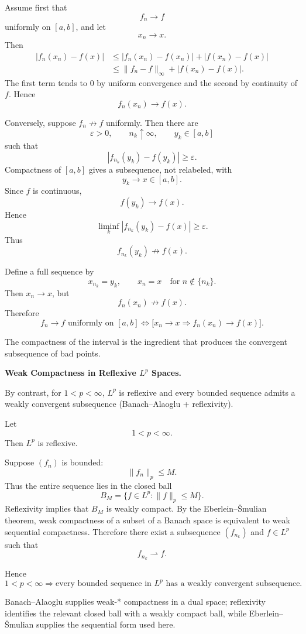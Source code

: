 \begin{solution}
Assume first that
\[
f_n\to f
\]
uniformly on \([a,b]\), and let
\[
x_n\to x.
\]
Then
\[
\begin{aligned}
|f_n(x_n)-f(x)|
&\le
|f_n(x_n)-f(x_n)|
+
|f(x_n)-f(x)|\\
&\le
\|f_n-f\|_\infty
+
|f(x_n)-f(x)|.
\end{aligned}
\]
The first term tends to \(0\) by uniform convergence and the second by continuity of \(f\).
Hence
\[
\boxed{f_n(x_n)\to f(x).}
\]

Conversely, suppose \(f_n\not\to f\) uniformly. Then there are
\[
\varepsilon>0,\qquad
n_k\uparrow\infty,\qquad
y_k\in[a,b]
\]
such that
\[
|f_{n_k}(y_k)-f(y_k)|\ge\varepsilon.
\]
Compactness of \([a,b]\) gives a subsequence, not relabeled, with
\[
y_k\to x\in[a,b].
\]
Since \(f\) is continuous,
\[
f(y_k)\to f(x).
\]
Hence
\[
\liminf_k
|f_{n_k}(y_k)-f(x)|
\ge
\varepsilon.
\]
Thus
\[
f_{n_k}(y_k)\not\to f(x).
\]

Define a full sequence by
\[
x_{n_k}=y_k,
\qquad
x_n=x
\quad
\text{for }n\notin\{n_k\}.
\]
Then \(x_n\to x\), but
\[
f_n(x_n)\not\to f(x).
\]
Therefore
\[
\boxed{
f_n\to f\text{ uniformly on }[a,b]
\iff
\bigl[x_n\to x\Longrightarrow f_n(x_n)\to f(x)\bigr].
}
\]

The compactness of the interval is the ingredient that produces the convergent subsequence of
bad points.
\end{solution}


\begin{problem}[CP-II-0154]
\label{prob:cp-ii-0154}
\textbf{Weak Compactness in Reflexive \(L^p\) Spaces.}

\hspace*{1.5em}By contrast, for $1<p<\infty$, $L^p$ is reflexive and every bounded sequence
		admits a weakly convergent subsequence (Banach--Alaoglu + reflexivity).
\end{problem}

\begin{solution}
Let
\[
1<p<\infty.
\]
Then \(L^p\) is reflexive.

Suppose \((f_n)\) is bounded:
\[
\|f_n\|_p\le M.
\]
Thus the entire sequence lies in the closed ball
\[
B_M=\{f\in L^p:\|f\|_p\le M\}.
\]
Reflexivity implies that \(B_M\) is weakly compact. By the Eberlein--\v{S}mulian theorem, weak
compactness of a subset of a Banach space is equivalent to weak sequential compactness.
Therefore there exist a subsequence \((f_{n_k})\) and \(f\in L^p\) such that
\[
f_{n_k}\rightharpoonup f.
\]

Hence
\[
\boxed{
1<p<\infty
\Longrightarrow
\text{every bounded sequence in }L^p
\text{ has a weakly convergent subsequence}.
}
\]

Banach--Alaoglu supplies weak-* compactness in a dual space; reflexivity identifies the relevant
closed ball with a weakly compact ball, while Eberlein--\v{S}mulian supplies the sequential
form used here.
\end{solution}


